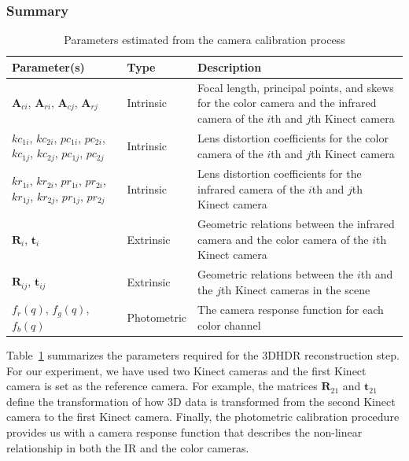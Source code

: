 \subsubsection{Summary}


\begin{table}[h]\footnotesize
\centering
  \caption{Parameters estimated from the camera calibration process}
  \label{tab_calibration}
    \begin{tabular}{|p{2.0cm}|l|p{4.0cm}|}
        \hline
       \bf{Parameter(s)}        &  \bf{Type}      &  \bf{Description}                                                        \\ \hline
        $\mathbf{A}_{ci}$, $\mathbf{A}_{ri}$, $\mathbf{A}_{cj}$, $\mathbf{A}_{rj}$  & Intrinsic & Focal length, principal points, and skews for the color camera and the infrared camera of the $i$th and $j$th Kinect camera \\ \hline
        $kc_{1i}$, $kc_{2i}$, $pc_{1i}$, $pc_{2i}$, $kc_{1j}$, $kc_{2j}$, $pc_{1j}$, $pc_{2j}$   & Intrinsic & Lens distortion coefficients for the color camera of the $i$th and $j$th Kinect camera \\  \hline
        $kr_{1i}$, $kr_{2i}$, $pr_{1i}$, $pr_{2i}$, $kr_{1j}$, $kr_{2j}$, $pr_{1j}$, $pr_{2j}$  & Intrinsic & Lens distortion coefficients for the infrared camera of the $i$th and $j$th Kinect camera \\ \hline
        $\mathbf{R}_i$, $\mathbf{t}_i$             & Extrinsic & Geometric relations between the infrared camera and the color camera of the $i$th Kinect camera \\ \hline
        $\mathbf{R}_{ij}$, $\mathbf{t}_{ij}$    & Extrinsic & Geometric relations between the $i$th and the $j$th Kinect cameras in the scene \\
        \hline
        $f_r(q)$, $f_g(q)$, $f_b(q)$    & Photometric & The camera response function for each color channel\\
        \hline
    \end{tabular}
\end{table}

Table~\ref{tab_calibration} summarizes the parameters required for the 3DHDR reconstruction step. For our experiment, we have used two Kinect cameras and the first Kinect camera is set as the reference camera. For example, the matrices $\mathbf{R}_{21}$ and $\mathbf{t}_{21}$ define the transformation of how 3D data is transformed from the second Kinect camera to the first Kinect camera. Finally, the photometric calibration procedure provides us with a camera response function that describes the non-linear relationship in both the IR and the color cameras.


